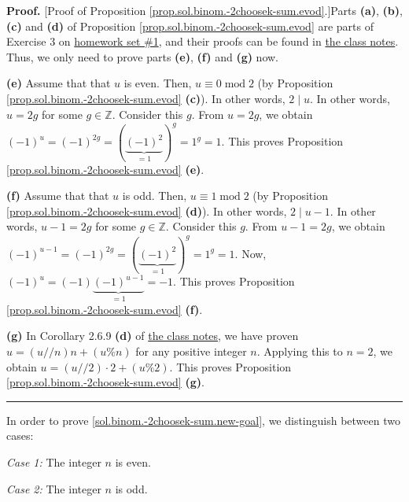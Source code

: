 \documentclass[paper=a4, fontsize=12pt]{scrartcl}%
\theoremstyle{plainsl}
\theoremstyle{definition}
\theoremstyle{remark}
\newenvironment{proof}[1][Proof]{\noindent\textbf{#1.} }{\ \rule{0.5em}{0.5em}}
\begin{document}
\begin{proof}
[Proof of Proposition \ref{prop.sol.binom.-2choosek-sum.evod}.]Parts
\textbf{(a)}, \textbf{(b)}, \textbf{(c)} and \textbf{(d)} of Proposition
\ref{prop.sol.binom.-2choosek-sum.evod} are parts of Exercise 3 on
\href{http://www.cip.ifi.lmu.de/~grinberg/t/19s/hw1s.pdf}{homework set \#1},
and their proofs can be found in
\href{http://www.cip.ifi.lmu.de/~grinberg/t/19s/notes.pdf}{the class notes}.
Thus, we only need to prove parts \textbf{(e)}, \textbf{(f)} and \textbf{(g)} now.

\textbf{(e)} Assume that that $u$ is even. Then, $u\equiv0\operatorname{mod}2$
(by Proposition \ref{prop.sol.binom.-2choosek-sum.evod} \textbf{(c)}). In
other words, $2\mid u$. In other words, $u=2g$ for some $g\in\mathbb{Z}$.
Consider this $g$. From $u=2g$, we obtain $\left(  -1\right)  ^{u}=\left(
-1\right)  ^{2g}=\left(  \underbrace{\left(  -1\right)  ^{2}}_{=1}\right)
^{g}=1^{g}=1$. This proves Proposition \ref{prop.sol.binom.-2choosek-sum.evod}
\textbf{(e)}.

\textbf{(f)} Assume that that $u$ is odd. Then, $u\equiv1\operatorname{mod}2$
(by Proposition \ref{prop.sol.binom.-2choosek-sum.evod} \textbf{(d)}). In
other words, $2\mid u-1$. In other words, $u-1=2g$ for some $g\in\mathbb{Z}$.
Consider this $g$. From $u-1=2g$, we obtain $\left(  -1\right)  ^{u-1}=\left(
-1\right)  ^{2g}=\left(  \underbrace{\left(  -1\right)  ^{2}}_{=1}\right)
^{g}=1^{g}=1$. Now, $\left(  -1\right)  ^{u}=\left(  -1\right)
\underbrace{\left(  -1\right)  ^{u-1}}_{=1}=-1$. This proves Proposition
\ref{prop.sol.binom.-2choosek-sum.evod} \textbf{(f)}.

\textbf{(g)} In Corollary 2.6.9 \textbf{(d)} of
\href{http://www.cip.ifi.lmu.de/~grinberg/t/19s/notes.pdf}{the class notes},
we have proven $u=\left(  u//n\right)
n+\left(  u\%n\right)  $ for any positive integer $n$. Applying this to $n=2$,
we obtain $u=\left(  u//2\right)  \cdot2+\left(  u\%2\right)  $. This proves
Proposition \ref{prop.sol.binom.-2choosek-sum.evod} \textbf{(g)}.
\end{proof}

In order to prove \eqref{sol.binom.-2choosek-sum.new-goal}, we distinguish
between two cases:

\textit{Case 1:} The integer $n$ is even.

\textit{Case 2:} The integer $n$ is odd.
\end{document}
